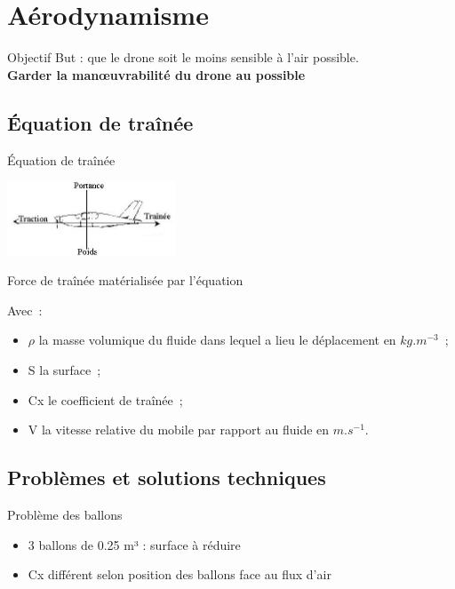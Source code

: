 \section{Aérodynamisme}

\begin{frame}{Objectif}
 But : que le drone soit le moins sensible à l'air possible. \\
 \textbf{Garder la manœuvrabilité du drone au possible}
\end{frame}

\subsection{Équation de traînée}
\begin{frame}{Équation de traînée}
  \begin{center}
		\includegraphics[width=5cm]{../Images/portance.jpg}
	\end{center}
 Force de traînée matérialisée par l'équation \\
 \begin{center}
 \end{center}
 Avec~:
 \begin{itemize}
  \item $\rho$ la masse volumique du fluide dans lequel a lieu le déplacement en $kg.m^{-3}$~;
  \item S la surface~;
  \item Cx le coefficient de traînée~;
  \item V la vitesse relative du mobile par rapport au fluide en $m.s^{-1}$.
 \end{itemize}
\end{frame}

\subsection{Problèmes et solutions techniques}
\begin{frame}{Problème des ballons}
  \begin{itemize}
	\item 3 ballons de 0.25 m³ : surface à réduire
  \item Cx différent selon position des ballons face au flux d'air
\end{itemize}
\end{frame}

